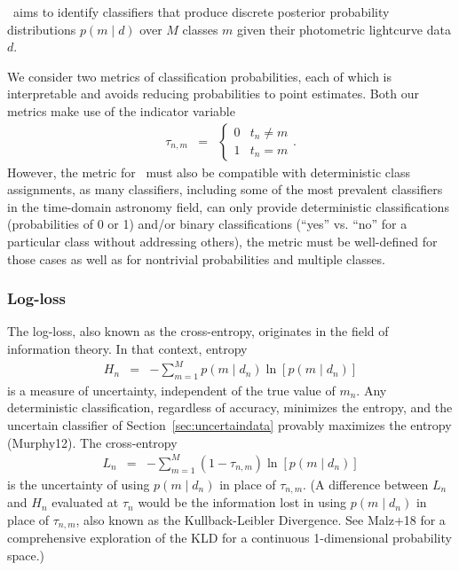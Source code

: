 \plasticc\ aims to identify classifiers that produce discrete posterior probability distributions $p(m \mid d)$ over $M$ classes $m$ given their photometric lightcurve data $d$.

We consider two  metrics of classification probabilities, each of which is interpretable and avoids reducing probabilities to point estimates.
Both our metrics make use of the indicator variable
\begin{eqnarray}
  \label{eq:indicator}
  \tau_{n, m} &=& \begin{cases}
  0 & t_{n} \neq m\\
  1 & t_{n} = m
  \end{cases}.
\end{eqnarray}
However, the metric for \plasticc\ must also be compatible with deterministic class assignments, as many classifiers, including some of the most prevalent classifiers in the time-domain astronomy field, can only provide deterministic classifications (probabilities of 0 or 1) and/or binary classifications (``yes'' vs. ``no'' for a particular class without addressing others), the metric must be well-defined for those cases as well as for nontrivial probabilities and multiple classes.


\subsubsection{Log-loss}
\label{sec:logloss}

The log-loss, also known as the cross-entropy, originates in the field of information theory.
In that context, entropy
\begin{eqnarray}
  \label{eq:entropy}
  H_{n} &=& -\sum_{m=1}^{M}p(m \mid d_{n})\ln[p(m \mid d_{n})]
\end{eqnarray}
is a measure of uncertainty, independent of the true value of $m_{n}$.
Any deterministic classification, regardless of accuracy, minimizes the entropy, and the uncertain classifier of Section~\ref{sec:uncertaindata} provably maximizes the entropy (Murphy12).
The cross-entropy
\begin{eqnarray}
  \label{eq:logloss}
  L_{n} &=& -\sum_{m=1}^{M}(1-\tau_{n, m})\ln[p(m \mid d_{n})]
\end{eqnarray}
is the uncertainty of using $p(m \mid d_{n})$ in place of $\tau_{n, m}$.
(A difference between $L_{n}$ and $H_{n}$ evaluated at $\tau_{n}$ would be the information lost in using $p(m \mid d_{n})$ in place of $\tau_{n, m}$, also known as the Kullback-Leibler Divergence.
See Malz+18 for a comprehensive exploration of the KLD for a continuous 1-dimensional probability space.)

